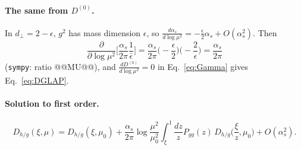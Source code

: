 \documentclass[10pt]{article}
\numberwithin{equation}{section}
\begin{document}
\paragraph{The same from $D^{(0)}$.} In $d_\perp=2-\epsilon$, $g^2$ has mass dimension $\epsilon$, so $\frac{d\alpha_s}{d\log\mu^2}=-\frac\epsilon2\alpha_s+O(\alpha_s^2)$. Then
\begin{equation}
\frac{\partial}{\partial\log\mu^2}\Big[\frac{\alpha_s}{2\pi}\frac1{\bar\epsilon}\Big]=\frac{\alpha_s}{2\pi}\Big(-\frac\epsilon2\Big)\Big(-\frac2\epsilon\Big)=\frac{\alpha_s}{2\pi}
\end{equation}
(\texttt{sympy}: ratio @@MU@@), and $\frac{dD^{(0)}}{d\log\mu^2}=0$ in Eq.~\eqref{eq:Gamma} gives Eq.~\eqref{eq:DGLAP}.

\paragraph{Solution to first order.}
\begin{equation}
D_{h/g}(\xi,\mu)=D_{h/g}(\xi,\mu_0)+\frac{\alpha_s}{2\pi}\log\frac{\mu^2}{\mu_0^2}\int_\xi^1\frac{dz}{z}P_{gg}(z)\,D_{h/g}\Big(\frac{\xi}{z},\mu_0\Big)+O(\alpha_s^2).
\end{equation}

\end{document}
